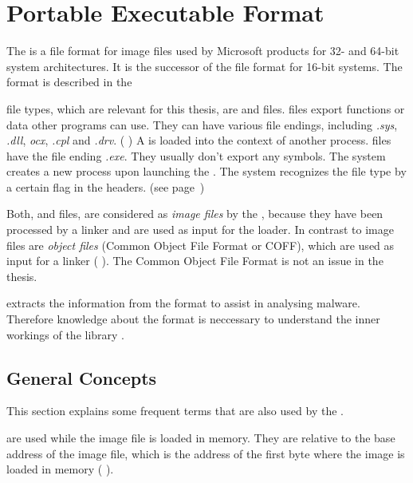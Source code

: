 \chapter{Portable Executable Format} \label{chap:peformat}

The \PE{} is a file format for image files used by Microsoft products for 32- and 64-bit system architectures. It is the successor of the \NZ{} file format for 16-bit systems. The \PE{} format is described in the \PECOFF{} \cite{pespec}

\PE{} file types, which are relevant for this thesis, are \DLL{} and \EXE{} files. \DLL{} files export functions or data other programs can use. They can have various file endings, including \emph{.sys}, \emph{.dll}, \emph{ocx}, \emph{.cpl} and \emph{.drv}. (\cf{} \cite{micrdll}) A \DLL{} is loaded into the context of another process.
\EXE{} files have the file ending \emph{.exe}. They usually don't export any symbols. The system creates a new process upon launching the \EXE{}.
The system recognizes the file type by a certain flag in the \PE{} headers. (see page~\pageref{dllflag}) 

Both, \EXE{} and \DLL{} files, are considered as \emph{image files} by the \PECOFF{}, because they have been processed by a linker and are used as input for the loader. In contrast to image files are \emph{object files} (Common Object File Format or {COFF}), which are used as input for a linker (\cf{} \cite[]{pespec}). The Common Object File Format is not an issue in the thesis.

\portex{} extracts the information from the \PE{} format to assist in analysing malware. Therefore knowledge about the \PE{} format is neccessary to understand the inner workings of the library \portex{}. 

\section{General Concepts}


This section explains some frequent terms that are also used by the \PECOFF{}. 

\begin{definition}[RVA]
\emph{} are used while the image file is loaded in memory. They are relative to the base address of the image file, which is the address of the first byte where the image is loaded in memory (\cf{} \cite[]{pespec}).
\end{definition} 

